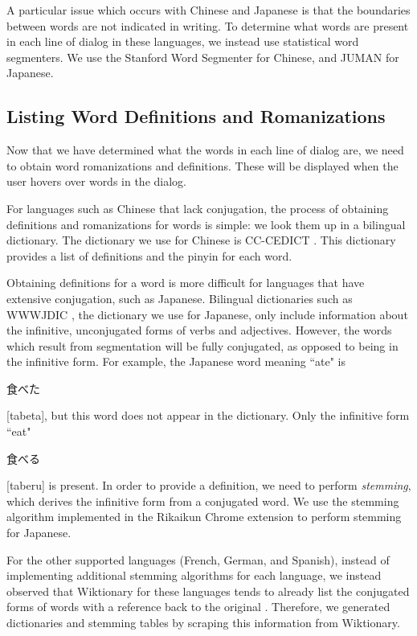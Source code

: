 \documentclass{sigchi}
\begin{document}
A particular issue which occurs with Chinese and Japanese is that the boundaries between
words are not indicated in writing. To determine what words are present
in each line of dialog in these languages, we instead use statistical word segmenters. We use the Stanford Word Segmenter \cite{stanfordsegmenter} for Chinese, and JUMAN \cite{juman} for Japanese.

\subsection{Listing Word Definitions and Romanizations}

Now that we have determined what the words in each line of dialog are, we need
to obtain word romanizations and definitions. These will be displayed when
the user hovers over words in the dialog.

For languages such as Chinese that lack conjugation, the process of obtaining definitions and romanizations for words is simple: we look them up in a bilingual dictionary. The dictionary we use for Chinese is CC-CEDICT \cite{mdbg}. This dictionary provides a list of definitions and the pinyin for each word.

Obtaining definitions for a word is more difficult for languages that have extensive conjugation, such as Japanese. Bilingual dictionaries such as WWWJDIC \cite{wwwjdic}, the dictionary we use for Japanese, only include information about the infinitive, unconjugated forms of verbs and adjectives. However, the words which result from segmentation will be fully conjugated, as opposed to being in the infinitive form. For example, the Japanese word meaning ``ate" is \begin{CJK}{UTF8}{min}食べた\end{CJK} [tabeta], but this word does not appear in the dictionary. Only the infinitive form ``eat" \begin{CJK}{UTF8}{min}食べる\end{CJK} [taberu] is present. In order to provide a definition, we need to perform \emph{stemming}, which derives the infinitive form from a conjugated word. We use the stemming algorithm implemented in the Rikaikun Chrome extension \cite{rikaikun} to perform stemming for Japanese.

For the other supported languages (French, German, and Spanish), instead of implementing additional stemming algorithms for each language, we instead observed that Wiktionary for these languages tends to already list the conjugated forms of words with a reference back to the original \cite{wiktionary}. Therefore, we generated dictionaries and stemming tables by scraping this information from Wiktionary.
\end{document}
